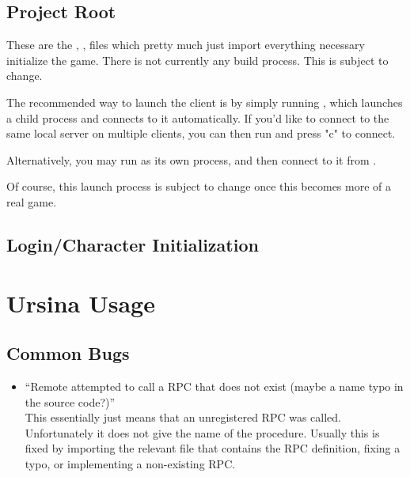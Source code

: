 \documentclass{article}
\begin{document}
\subsection{Project Root}
These are the , , 
files which pretty much just import everything necessary initialize the game. 
There is not currently any build process. This is subject to change.

The recommended way to launch the client is by simply running , which
launches a child  process and connects to it automatically.
If you'd like to connect to the same local server on multiple clients, you can then run
 and press "c" to connect.

Alternatively, you may run  as its own process, and then connect
to it from .

Of course, this launch process is subject to change once this becomes more of a real game.


\subsection{Login/Character Initialization}


\section{Ursina Usage}
\subsection{Common Bugs}
\begin{itemize}
    \item ``Remote attempted to call a RPC that does not exist (maybe a name typo in the source code?)''\\
        This essentially just means that an unregistered RPC was called. Unfortunately it does not give
        the name of the procedure. Usually this is fixed by importing the relevant file that contains the
        RPC definition, fixing a typo, or implementing a non-existing RPC.
\end{itemize}
\end{document}
